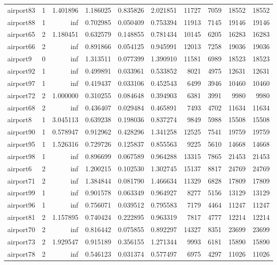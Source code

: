 \begin{longtable}{|l|r|r|r|r|r|r|r|r|r|}
airport83 & 1 & 1.401896 & 1.186025 & 0.835826 & 2.021851 & 11727 & 7059 & 18552 & 18552 \\
airport88 & 1 & inf & 0.702985 & 0.050409 & 0.753394 & 11913 & 7145 & 19146 & 19146 \\
airport65 & 2 & 1.180451 & 0.632579 & 0.148855 & 0.781434 & 10145 & 6205 & 16283 & 16283 \\
airport66 & 2 & inf & 0.891866 & 0.054125 & 0.945991 & 12013 & 7258 & 19036 & 19036 \\
airport9 & 0 & inf & 1.313511 & 0.077399 & 1.390910 & 11581 & 6989 & 18523 & 18523 \\
airport92 & 1 & inf & 0.499891 & 0.033961 & 0.533852 & 8021 & 4975 & 12631 & 12631 \\
airport97 & 1 & inf & 0.419437 & 0.033106 & 0.452543 & 6499 & 3946 & 10460 & 10460 \\
airport72 & 2 & 1.000000 & 0.310255 & 0.084648 & 0.394903 & 6381 & 3991 & 9980 & 9980 \\
airport68 & 2 & inf & 0.436407 & 0.029484 & 0.465891 & 7493 & 4702 & 11634 & 11634 \\
airport8 & 1 & 3.045113 & 0.639238 & 0.198036 & 0.837274 & 9849 & 5988 & 15508 & 15508 \\
airport90 & 1 & 0.578947 & 0.912962 & 0.428296 & 1.341258 & 12525 & 7541 & 19759 & 19759 \\
airport95 & 1 & 1.526316 & 0.729726 & 0.125837 & 0.855563 & 9225 & 5610 & 14668 & 14668 \\
airport98 & 1 & inf & 0.896699 & 0.067589 & 0.964288 & 13315 & 7865 & 21453 & 21453 \\
airport6 & 2 & inf & 1.200215 & 0.102530 & 1.302745 & 15137 & 8817 & 24769 & 24769 \\
airport71 & 2 & inf & 1.384844 & 0.081790 & 1.466634 & 11329 & 6828 & 17809 & 17809 \\
airport99 & 1 & inf & 0.901578 & 0.063349 & 0.964927 & 8277 & 5156 & 13129 & 13129 \\
airport96 & 1 & inf & 0.756071 & 0.039512 & 0.795583 & 7179 & 4464 & 11247 & 11247 \\
airport81 & 2 & 1.157895 & 0.740424 & 0.222895 & 0.963319 & 7817 & 4777 & 12214 & 12214 \\
airport70 & 2 & inf & 0.816442 & 0.075855 & 0.892297 & 14327 & 8351 & 23699 & 23699 \\
airport73 & 2 & 1.929547 & 0.915189 & 0.356155 & 1.271344 & 9993 & 6181 & 15890 & 15890 \\
airport78 & 2 & inf & 0.546123 & 0.031374 & 0.577497 & 6975 & 4297 & 11026 & 11026 \\

\end{longtable}
